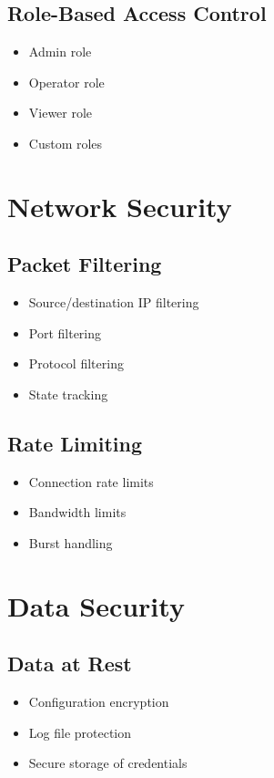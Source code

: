 \documentclass{article}
\begin{document}
\subsection{Role-Based Access Control}
\begin{itemize}
    \item Admin role
    \item Operator role
    \item Viewer role
    \item Custom roles
\end{itemize}

\section{Network Security}

\subsection{Packet Filtering}
\begin{itemize}
    \item Source/destination IP filtering
    \item Port filtering
    \item Protocol filtering
    \item State tracking
\end{itemize}

\subsection{Rate Limiting}
\begin{itemize}
    \item Connection rate limits
    \item Bandwidth limits
    \item Burst handling
\end{itemize}

\section{Data Security}

\subsection{Data at Rest}
\begin{itemize}
    \item Configuration encryption
    \item Log file protection
    \item Secure storage of credentials
\end{itemize}
\end{document}
